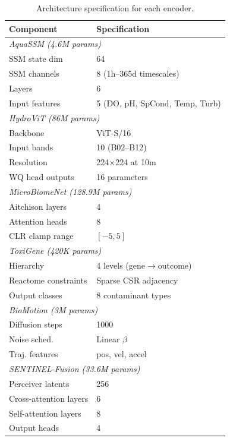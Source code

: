 \begin{table}[h]
\centering
\caption{Architecture specification for each encoder.}
\label{tab:arch_details}
\small
\begin{tabular}{lp{4.5cm}}
\toprule
\textbf{Component} & \textbf{Specification} \\
\midrule
\multicolumn{2}{l}{\textit{AquaSSM (4.6M params)}} \\
SSM state dim & 64 \\
SSM channels & 8 (1h--365d timescales) \\
Layers & 6 \\
Input features & 5 (DO, pH, SpCond, Temp, Turb) \\
\midrule
\multicolumn{2}{l}{\textit{HydroViT (86M params)}} \\
Backbone & ViT-S/16 \\
Input bands & 10 (B02--B12) \\
Resolution & 224$\times$224 at 10m \\
WQ head outputs & 16 parameters \\
\midrule
\multicolumn{2}{l}{\textit{MicroBiomeNet (128.9M params)}} \\
Aitchison layers & 4 \\
Attention heads & 8 \\
CLR clamp range & $[-5, 5]$ \\
\midrule
\multicolumn{2}{l}{\textit{ToxiGene (420K params)}} \\
Hierarchy & 4 levels (gene$\to$outcome) \\
Reactome constraints & Sparse CSR adjacency \\
Output classes & 8 contaminant types \\
\midrule
\multicolumn{2}{l}{\textit{BioMotion (3M params)}} \\
Diffusion steps & 1000 \\
Noise sched. & Linear $\beta$ \\
Traj. features & pos, vel, accel \\
\midrule
\multicolumn{2}{l}{\textit{SENTINEL-Fusion (33.6M params)}} \\
Perceiver latents & 256 \\
Cross-attention layers & 6 \\
Self-attention layers & 8 \\
Output heads & 4 \\
\bottomrule
\end{tabular}
\end{table}
